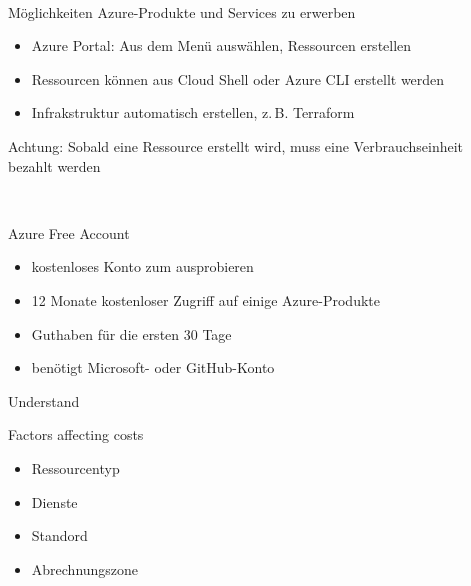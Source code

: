 \documentclass{scrartcl}
\newenvironment{flashcard}[2][]{%
    #1
    \vfill
    \centerline{\Large{#2}}
    \vfill
\newpage
}
{\newpage}
\begin{document}
    \begin{flashcard}[\ ]{Möglichkeiten Azure-Produkte und Services zu erwerben}
        \begin{itemize}
            \item Azure Portal: Aus dem Menü auswählen, Ressourcen erstellen
            \item Ressourcen können aus Cloud Shell oder Azure CLI erstellt werden
            \item Infrakstruktur automatisch erstellen, z.\,B. Terraform
        \end{itemize}

        \vspace{5mm}
        Achtung: Sobald eine Ressource erstellt wird, muss eine Verbrauchseinheit bezahlt werden
    \end{flashcard}

    \begin{flashcard}[\ ]{Azure Free Account}
        \begin{itemize}
            \item kostenloses Konto zum ausprobieren
            \item 12 Monate kostenloser Zugriff auf einige Azure-Produkte
            \item Guthaben für die ersten 30 Tage
            \item benötigt Microsoft- oder GitHub-Konto
        \end{itemize}

    \end{flashcard}

    \begin{flashcard}[Understand]{Factors affecting costs}
        \begin{itemize}
            \item Ressourcentyp
            \item Dienste
            \item Standord
            \item Abrechnungszone
        \end{itemize}

    \end{flashcard}
\end{document}
